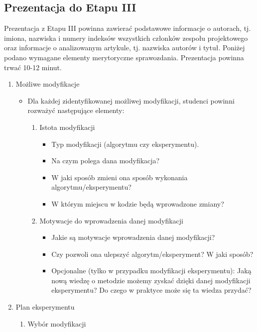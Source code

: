 \documentclass{article}
\begin{document}
\subsection{Prezentacja do Etapu III}
Prezentacja z Etapu III powinna zawierać podstawowe informacje 
o autorach, tj. imiona, nazwiska i numery indeksów wszystkich członków zespołu 
projektowego oraz informacje o analizowanym artykule, tj. nazwiska autorów i 
tytuł. 
Poniżej podano wymagane elementy merytoryczne sprawozdania.
Prezentacja powinna trwać 10-12 minut.
\begin{enumerate}
    \item Możliwe modyfikacje
    \begin{itemize}
        \item Dla każdej zidentyfikowanej możliwej modyfikacji, studenci powinni rozważyć następujące elementy:
        \begin{enumerate}
            \item Istota modyfikacji
            \begin{itemize}
                \item Typ modyfikacji (algorytmu czy eksperymentu).
                \item Na czym polega dana modyfikacja?
                \item W jaki sposób zmieni ona sposób wykonania algorytmu/eksperymentu?
                \item W którym miejscu w kodzie będą wprowadzone zmiany?
            \end{itemize}
            \item Motywacje do wprowadzenia danej modyfikacji
            \begin{itemize}
                \item Jakie są motywacje wprowadzenia danej modyfikacji?
                \item Czy pozwoli ona ulepszyć algorytm/eksperyment? W jaki sposób?
                \item Opcjonalne (tylko w przypadku modyfikacji eksperymentu): Jaką nową wiedzę o metodzie możemy zyskać dzięki danej modyfikacji eksperymentu? Do czego w praktyce może się ta wiedza przydać?
            \end{itemize}
        \end{enumerate}
    \end{itemize}
    \item Plan eksperymentu
    \begin{enumerate}
        \item Wybór modyfikacji

\end{enumerate}
\end{enumerate}
\end{document}
